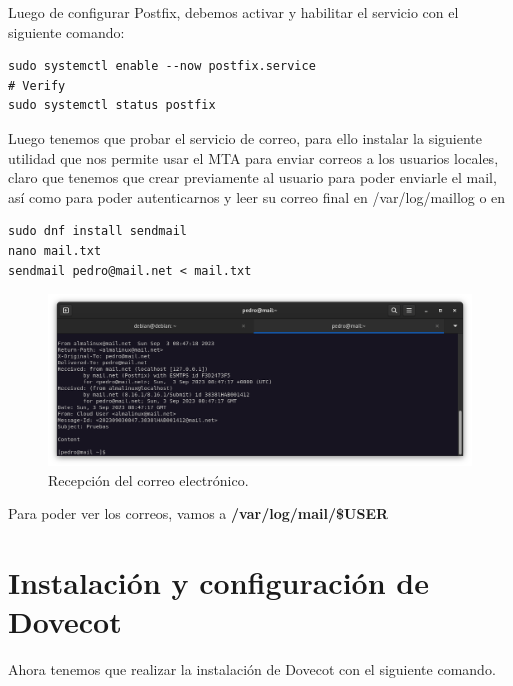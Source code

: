 Luego de configurar Postfix, debemos activar y habilitar el servicio con el siguiente comando:

\begin{lstlisting}[style=mybash]
sudo systemctl enable --now postfix.service
# Verify
sudo systemctl status postfix
\end{lstlisting}

Luego tenemos que probar el servicio de correo, para ello instalar la siguiente utilidad que nos permite usar el MTA para enviar correos a los usuarios locales, claro que tenemos que crear previamente al usuario para poder enviarle el mail, así como para poder autenticarnos y leer su correo final en /var/log/maillog o en 
\begin{lstlisting}[style=mybash]
sudo dnf install sendmail
nano mail.txt
sendmail pedro@mail.net < mail.txt
\end{lstlisting}

\begin{figure}[H]
	\centering
	\includegraphics[scale=0.30]{05}
	\caption{Recepción del correo electrónico.}
\end{figure}

Para poder ver los correos, vamos a \textbf{/var/log/mail/\$USER}

\newpage 
\section{Instalación y configuración de Dovecot}

Ahora tenemos que realizar la instalación de Dovecot con el siguiente comando.




%



%


